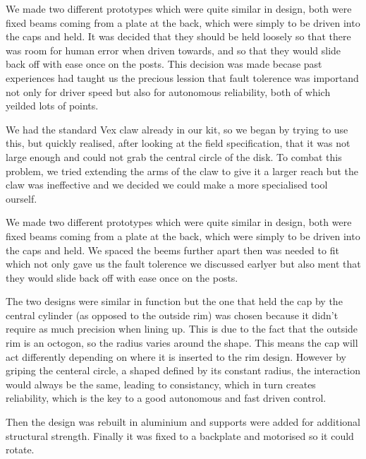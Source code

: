 \documentclass[../../../main.tex]{subfiles}
\begin{document}
We made two different prototypes which were quite similar in design, both were fixed beams coming from a plate at the back, which were simply to be driven into the caps and held.
It was decided that they should be held loosely so that there was room for human error when driven towards, and so that they would slide back off with ease once on the posts.
This decision was made becase past experiences had taught us the precious lession that fault tolerence was importand not only for driver speed but also for autonomous reliability, both of which yeilded lots of points.
\par

We had the standard Vex claw already in our kit, so we began by trying to use this, but quickly realised, after looking at the field specification, that it was not large enough and could not grab the central circle of the disk.
To combat this problem, we tried extending the arms of the claw to give it a larger reach but the claw was ineffective and we decided we could make a more specialised tool ourself.
\par


We made two different prototypes which were quite similar in design, both were fixed beams coming from a plate at the back, which were simply to be driven into the caps and held.
We spaced the beems further apart then was needed to fit which not only gave us the fault tolerence we discussed earlyer but also ment that they would slide back off with ease once on the posts.

The two designs were similar in function but the one that held the cap by the 
central cylinder (as opposed to the outside rim) was chosen because it didn’t 
require as much precision when lining up. This is due to the fact that the outside rim
is an octogon, so the radius varies around the shape. This means the cap will act differently
depending on where it is inserted to the rim design. However by griping the centeral circle,
a shaped defined by its constant radius, the interaction would always be the same, leading to
consistancy, which in turn creates reliability, which is the key to a good autonomous and
fast driven control.
\par

Then the design was rebuilt in aluminium and supports were added for additional structural strength.
Finally it was fixed to a backplate and motorised so it could rotate.
\end{document}
